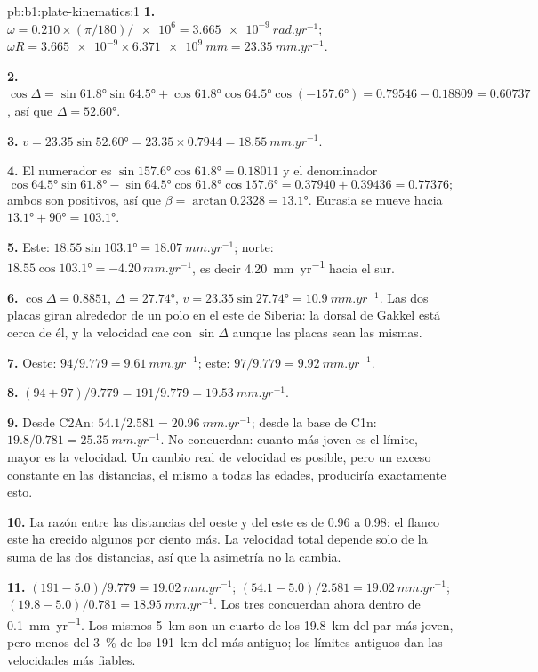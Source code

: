 \begin{solution}{pb:b1:plate-kinematics:1}
\textbf{1.} $\omega = 0.210\times(\pi/180)/\num{e6} = \qty{3.665e-9}{rad.yr^{-1}}$;
$\omega R = \num{3.665e-9}\times\qty{6.371e9}{mm} = \qty{23.35}{mm.yr^{-1}}$.

\textbf{2.} $\cos\Delta = \sin\ang{61.8}\sin\ang{64.5} + \cos\ang{61.8}
\cos\ang{64.5}\cos(\ang{-157.6}) = 0.79546 - 0.18809 = 0.60737$, así que
$\Delta = \ang{52.60}$.

\textbf{3.} $v = 23.35\sin\ang{52.60} = 23.35\times0.7944 =
\qty{18.55}{mm.yr^{-1}}$.

\textbf{4.} El numerador es $\sin\ang{157.6}\cos\ang{61.8} = 0.18011$ y el
denominador
\[
  \cos\ang{64.5}\sin\ang{61.8} - \sin\ang{64.5}\cos\ang{61.8}\cos\ang{157.6} =
  0.37940 + 0.39436 = 0.77376;
\]
ambos son positivos, así que $\beta = \arctan 0.2328 =
\ang{13.1}$. Eurasia se mueve hacia $\ang{13.1} + \ang{90} = \ang{103.1}$.

\textbf{5.} Este: $18.55\sin\ang{103.1} = \qty{18.07}{mm.yr^{-1}}$; norte:
$18.55\cos\ang{103.1} = \qty{-4.20}{mm.yr^{-1}}$, es decir \qty{4.20}{mm.yr^{-1}}
hacia el sur.

\textbf{6.} $\cos\Delta = 0.8851$, $\Delta = \ang{27.74}$, $v = 23.35
\sin\ang{27.74} = \qty{10.9}{mm.yr^{-1}}$. Las dos placas giran alrededor de un polo en
el este de Siberia: la dorsal de Gakkel está cerca de él, y la velocidad cae con
$\sin\Delta$ aunque las placas sean las mismas.

\textbf{7.} Oeste: $94/9.779 = \qty{9.61}{mm.yr^{-1}}$; este: $97/9.779 =
\qty{9.92}{mm.yr^{-1}}$.

\textbf{8.} $(94 + 97)/9.779 = 191/9.779 = \qty{19.53}{mm.yr^{-1}}$.

\textbf{9.} Desde C2An: $54.1/2.581 = \qty{20.96}{mm.yr^{-1}}$; desde la base de
C1n: $19.8/0.781 = \qty{25.35}{mm.yr^{-1}}$. No concuerdan: cuanto más joven es el límite, mayor es la velocidad. Un cambio real de
velocidad es posible, pero un exceso constante en las distancias, el mismo a todas las edades, produciría exactamente esto.

\textbf{10.} La razón entre las distancias del oeste y del este es de 0.96 a 0.98: el
flanco este ha crecido algunos por ciento más. La velocidad total depende solo de la
suma de las dos distancias, así que la asimetría no la cambia.

\textbf{11.} $(191 - 5.0)/9.779 = \qty{19.02}{mm.yr^{-1}}$;
$(54.1 - 5.0)/2.581 = \qty{19.02}{mm.yr^{-1}}$; $(19.8 - 5.0)/0.781 =
\qty{18.95}{mm.yr^{-1}}$. Los tres concuerdan ahora dentro de
\qty{0.1}{mm.yr^{-1}}. Los mismos \qty{5}{km} son un cuarto de los \qty{19.8}{km}
del par más joven, pero menos del \qty{3}{\percent} de los \qty{191}{km} del más antiguo;
los límites antiguos dan las velocidades más fiables.


\end{solution}
